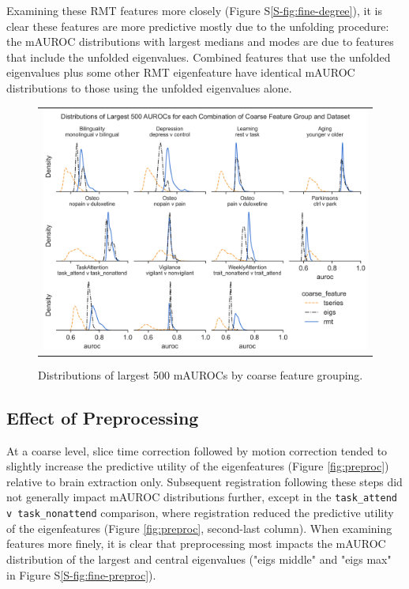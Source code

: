 \documentclass[12pt]{spieman}  %
\newcommand{\code}[1]{\small\texttt{#1}\normalsize}
\begin{document}
\begin{spacing}{2}
Examining these RMT features more closely (Figure S\ref{S-fig:fine-degree}),
it is clear these features are more predictive mostly due to the unfolding
procedure: the mAUROC distributions with largest medians and modes are due to
features that include the unfolded eigenvalues. Combined features that use
the unfolded eigenvalues plus some other RMT eigenfeature have identical
mAUROC distributions to those using the unfolded eigenvalues alone.


\begin{figure}
\begin{center}
\begin{tabular}{c}
\includegraphics[width=6.5in]{coarse_feature_largest_by_subgroup.png}
\end{tabular}
\end{center}
\caption
{ \label{fig:largest} Distributions of largest 500 mAUROCs by coarse feature grouping.}
\end{figure}

\subsection{Effect of Preprocessing}
At a coarse level, slice time correction followed by motion correction tended
to slightly increase the predictive utility of the eigenfeatures (Figure
\ref{fig:preproc}) relative to brain extraction only. Subsequent registration
following these steps did not generally impact mAUROC distributions further,
except in the \code{task\_attend v task\_nonattend} comparison, where
registration reduced the predictive utility of the eigenfeatures (Figure
\ref{fig:preproc}, second-last column). When examining features more finely, it
is clear that preprocessing most impacts the mAUROC distribution of the largest
and central eigenvalues ("eigs middle" and "eigs max" in Figure
S\ref{S-fig:fine-preproc}).


\end{spacing}
\end{document}
